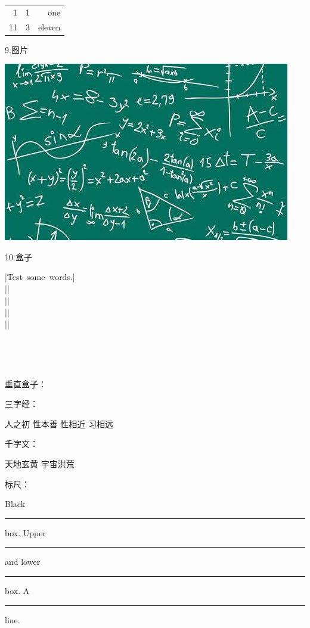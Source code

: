 \documentclass[12pt,UTF8]{ctexart}%
\begin{document}
\begin{tabular}{@{} r@{:}lr @{}}
\hline
1 & 1 & one \\
11 & 3 & eleven \\
\hline
\end{tabular}

9.图片\par
\includegraphics[scale=0.7,angle=90]{assets/th.jpg}


10.盒子\par

|\mbox{Test some words.}|\\
||\\
||\\
||\\
||


\\


\\[1ex]
\setlength{\fboxrule}{1.6pt}
\setlength{\fboxsep}{1em}

垂直盒子：
\par
三字经：\parbox[t]{3em}%
{人之初 性本善 性相近 习相远}
\quad
千字文：
\begin{minipage}[b][8ex][t]{4em}
天地玄黄 宇宙洪荒
\end{minipage}



标尺：
\par
Black \rule{12pt}{4pt} box.
Upper \rule[4pt]{6pt}{8pt} and
lower \rule[-4pt]{6pt}{8pt} box.
A \rule[-.4pt]{3em}{.4pt} line.
\end{document}
